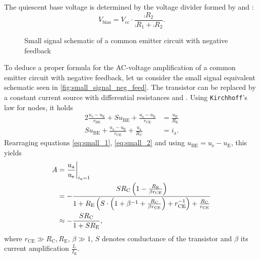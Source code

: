The quiescent base voltage is determined by the voltage divider formed by  and :
\begin{equation}\label{eq:bias_volt}
	V_\text{bias}=V_\text{cc}\cdot\frac{\comp{R_2}}{\comp{R_1}+\comp{R_2}}.
\end{equation}

\begin{figure}[tbp]
	\centering
	\caption{Small signal schematic of a common emitter circuit with negative feedback}
	\label{fig:small_signal_neg_feed}
\end{figure}

To deduce a proper formula for the AC-voltage amplification of a common emitter circuit with negative feedback, let us consider the small signal equivalent schematic seen in \autoref{fig:small_signal_neg_feed}.
The transistor can be replaced by a constant current source with differential resistances  and .
Using \texttt{Kirchhoff}'s law for nodes, it holds
\begin{alignat}{2}
	\frac{u_\text{e}-u_\text{E}}{r_\text{BE}}+Su_\text{BE}+\frac{u_\text{a}-u_\text{E}}{r_\text{CE}} &= \frac{u_\text{E}}{R_\text{E}} \label{eq:small_1}\\
	Su_\text{BE}+\frac{u_\text{a}-u_\text{E}}{r_\text{CE}} + \frac{u_\text{a}}{R_\text{C}}&= i_\text{a}. \label{eq:small_2}
\end{alignat}
Rearraging equations \ref{eq:small_1}, \ref{eq:small_2} and using $u_\text{BE}=u_\text{e}-u_\text{E}$, this yields
\begin{align}
	A&=\frac{u_\text{a}}{u_\text{e}}\at[\bigg]{i_\text{a}=1} \nonumber \\
	&=-\frac{SR_\text{C}\left(1-\frac{R_\text{E}}{\beta r_\text{CE}}\right)}{1+R_\text{E}\left(S\cdot\left(1+\beta^{-1}+\frac{R_\text{C}}{\beta r_\text{CE}}\right)+r_\text{CE}^{-1}\right)+\frac{R_\text{C}}{r_\text{CE}}} \nonumber \\
	&\approx -\frac{SR_\text{C}}{1+SR_\text{E}}, \label{eq:amp_neg_fb}
\end{align}
where $r_\text{CE}\gg R_\text{C},R_\text{E}$, $\beta\gg 1$, $S$ denotes conductance of the transistor and $\beta$ its current amplification $\frac{I_\text{c}}{I_\text{B}}$.
